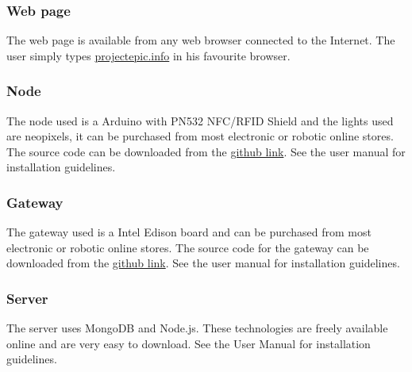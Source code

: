 \subsubsection{Web page}
The web page is available from any web browser connected to the Internet. The user simply types \url{projectepic.info} in his favourite browser.
\subsubsection{Node}
The node used is a Arduino with PN532 NFC/RFID Shield and the lights used are neopixels, it can be purchased from most electronic or robotic online stores. The source code can be downloaded from the \href{https://github.com/Unsolvable-Solutions/Project-EPIC/tree/master/EPICNode}{github link}. See the user manual for installation guidelines. 
\subsubsection{Gateway}
The gateway used is a Intel Edison board and can be purchased from most electronic or robotic online stores. The source code for the gateway can be downloaded from the \href{https://github.com/Unsolvable-Solutions/Project-EPIC/tree/master/EPICEdison}{github link}. See the user manual for installation guidelines.
\subsubsection{Server}
The server uses MongoDB and Node.js. These technologies are freely available online and are very easy to download. See the User Manual for installation guidelines.



